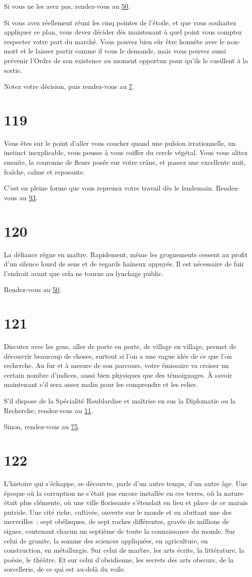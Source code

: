 \documentclass{report}
\newcommand{\gsection}[1]{
    \section{#1}
    \label{section-#1}
}
\newcommand{\glink}[1]{\hyperref[section-#1]{#1}}
\begin{document}
Si vous ne les avez pas, rendez-vous au \glink{50}.

Si vous avez réellement réuni les cinq pointes de l'étoile, et que vous souhaitez appliquer ce plan, vous devez décider dès maintenant à quel point vous comptez respecter votre part du marché. Vous pouvez bien sûr être honnête avec le non-mort et le laisser partir comme il vous le demande, mais vous pouvez aussi prévenir l'Ordre de son existence au moment opportun pour qu'ils le cueillent à la sortie.

Notez votre décision, puis rendez-vous au \glink{7}.

\gsection{119}

Vous êtes sur le point d'aller vous coucher quand une pulsion irrationnelle, un instinct inexplicable, vous pousse à vous coiffer du cercle végétal. Vous vous alitez ensuite, la couronne de fleurs posée sur votre crâne, et passez une excellente nuit, fraîche, calme et reposante.

C'est en pleine forme que vous reprenez votre travail dès le lendemain. Rendez-vous au \glink{93}.

\gsection{120}

La défiance règne en maître. Rapidement, même les grognements cessent au profit d'un silence lourd de sens et de regards haineux appuyés. Il est nécessaire de fuir l'endroit avant que cela ne tourne au lynchage public.

Rendez-vous au \glink{50}.

\gsection{121}

Discuter avec les gens, aller de porte en porte, de village en village, permet de découvrir beaucoup de choses, surtout si l'on a une vague idée de ce que l'on recherche. Au fur et à mesure de son parcours, votre émissaire va croiser un certain nombre d'indices, aussi bien physiques que des témoignages. À savoir maintenant s'il sera assez malin pour les comprendre et les relier.

S'il dispose de la Spécialité Roublardise et maîtrise en sus la Diplomatie ou la Recherche, rendez-vous au \glink{11}.

Sinon, rendez-vous au \glink{75}.

\gsection{122}

L'histoire qui s'échappe, se découvre, parle d'un autre temps, d'un autre âge. Une époque où la corruption ne s'était pas encore installée en ces terres, où la nature était plus clémente, où une ville florissante s'étendait en lieu et place de ce marais putride. Une cité riche, cultivée, ouverte sur le monde et en abritant une des merveilles : sept obélisques, de sept roches différentes, gravés de millions de signes, contenant chacun un septième de toute la connaissance du monde. Sur celui de granite, la somme des sciences appliquées, en agriculture, en construction, en métallurgie. Sur celui de marbre, les arts écrits, la littérature, la poésie, le théâtre. Et sur celui d'obsidienne, les secrets des arts obscurs, de la sorcellerie, de ce qui est au-delà du voile.
\end{document}
